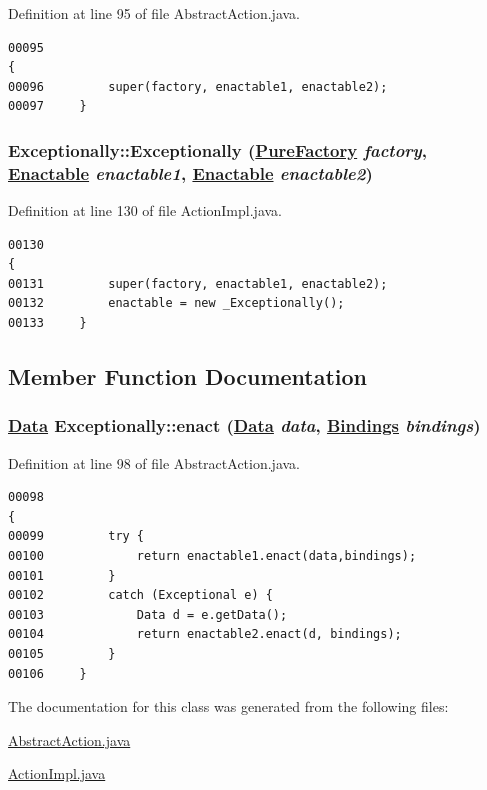 Definition at line 95 of file Abstract\-Action.java.\footnotesize\begin{verbatim}00095                                                                                           {
00096         super(factory, enactable1, enactable2);
00097     }
\end{verbatim}\normalsize 
\hypertarget{classExceptionally_a2}{
\subsubsection[Exceptionally]{\setlength{\rightskip}{0pt plus 5cm}Exceptionally::Exceptionally (\hyperlink{classPureFactory}{Pure\-Factory} {\em factory}, \hyperlink{interfaceEnactable}{Enactable} {\em enactable1}, \hyperlink{interfaceEnactable}{Enactable} {\em enactable2})}}
\label{classExceptionally_a2}




Definition at line 130 of file Action\-Impl.java.\footnotesize\begin{verbatim}00130                                                                                           {
00131         super(factory, enactable1, enactable2);
00132         enactable = new _Exceptionally();
00133     }
\end{verbatim}\normalsize 


\subsection{Member Function Documentation}
\hypertarget{classExceptionally_a1}{
\subsubsection[enact]{\setlength{\rightskip}{0pt plus 5cm}\hyperlink{interfaceData}{Data} Exceptionally::enact (\hyperlink{interfaceData}{Data} {\em data}, \hyperlink{interfaceBindings}{Bindings} {\em bindings})}}
\label{classExceptionally_a1}




Definition at line 98 of file Abstract\-Action.java.\footnotesize\begin{verbatim}00098                                                                                {
00099         try {
00100             return enactable1.enact(data,bindings);
00101         }
00102         catch (Exceptional e) {
00103             Data d = e.getData();
00104             return enactable2.enact(d, bindings);
00105         }
00106     }
\end{verbatim}\normalsize 


The documentation for this class was generated from the following files:\begin{CompactItemize}
\item 
\hyperlink{AbstractAction_8java-source}{Abstract\-Action.java}\item 
\hyperlink{ActionImpl_8java-source}{Action\-Impl.java}\end{CompactItemize}

